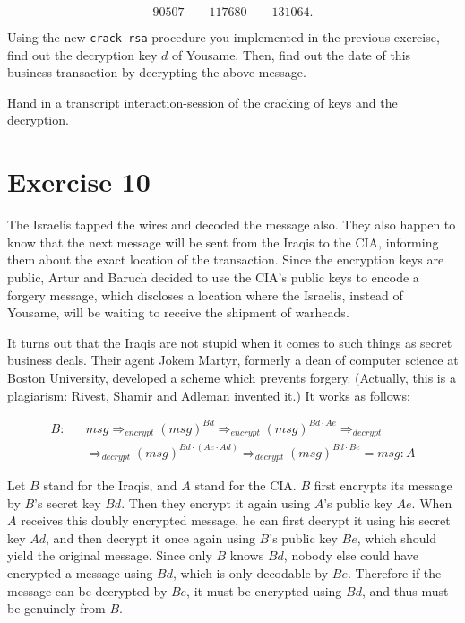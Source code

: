 \[90507 \qquad   117680  \qquad     131064.\]

Using the new {\tt crack-rsa} procedure you implemented in the previous
exercise, find out the decryption key $d$ of Yousame.  Then, find out
the date of this business transaction by decrypting the above message.

Hand in a transcript interaction-session of the cracking of keys and the
decryption.

\section{Exercise 10}

The Israelis tapped the wires and decoded the message also.  They also happen
to know that the next message will be sent from the Iraqis to the CIA,
informing them about the exact location of the transaction.   Since the 
encryption keys are public, Artur and Baruch decided to use the CIA's
public keys to encode a forgery message, which discloses a location where
the Israelis, instead of Yousame,  will be waiting to
receive the shipment of warheads.

It turns out that the Iraqis are not stupid when it comes to such things as
secret business deals.  Their agent Jokem Martyr, formerly a dean of computer
science at Boston University, developed a scheme which prevents forgery.
(Actually, this is a plagiarism: Rivest, Shamir and Adleman invented it.) It
works as follows:

\pagebreak

\begin{eqnarray*}
B:&& msg \Rightarrow_{encrypt} (msg)^{Bd}\Rightarrow_{encrypt}
(msg)^{Bd\cdot Ae} \Rightarrow_{decrypt}\\
&& \Rightarrow_{decrypt} (msg)^{Bd\cdot (Ae\cdot Ad)}
\Rightarrow_{decrypt} (msg)^{Bd\cdot Be} = msg :A
\end{eqnarray*}

Let $B$ stand for the Iraqis, and $A$ stand for the CIA.  $B$ first
encrypts its message by $B$'s secret key $Bd$.  Then they encrypt it
again using $A$'s public key $Ae$.  When $A$ receives this doubly encrypted
message, he can first decrypt it using his secret key $Ad$, and then
decrypt it once
again using $B$'s public key $Be$, which should yield the original message.
Since only $B$ knows $Bd$, nobody else could have encrypted a message
using $Bd$, which is only decodable by $Be$.  Therefore if the message
can be decrypted by $Be$, it must be encrypted using $Bd$, and thus must
be genuinely from $B$.

